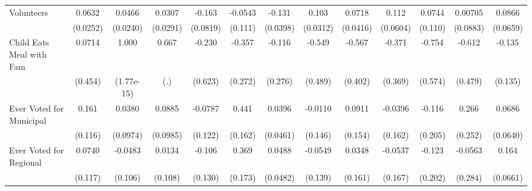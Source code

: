 {\begin{tabular}{l*{12}{c}}
\addlinespace
Volunteers  &      0.0632\sym{*}  &      0.0466         &      0.0307         &      -0.163\sym{*}  &     -0.0543         &      -0.131\sym{**} &       0.103\sym{***}&      0.0718         &       0.112         &      0.0744         &     0.00705         &      0.0866         \\
            &    (0.0252)         &    (0.0240)         &    (0.0291)         &    (0.0819)         &     (0.111)         &    (0.0398)         &    (0.0312)         &    (0.0416)         &    (0.0604)         &     (0.110)         &    (0.0883)         &    (0.0659)         \\
\addlinespace
Child Eats Meal with Fam&      0.0714         &       1.000\sym{***}&       0.667         &      -0.230         &      -0.357         &      -0.116         &      -0.549         &      -0.567         &      -0.371         &      -0.754         &      -0.612         &      -0.135         \\
            &     (0.454)         &  (1.77e-15)         &         (.)         &     (0.623)         &     (0.272)         &     (0.276)         &     (0.489)         &     (0.402)         &     (0.369)         &     (0.574)         &     (0.479)         &     (0.135)         \\
\addlinespace
Ever Voted for Municipal&       0.161         &      0.0380         &      0.0885         &     -0.0787         &       0.441\sym{**} &      0.0396         &     -0.0110         &      0.0911         &     -0.0396         &      -0.116         &       0.266         &      0.0686         \\
            &     (0.116)         &    (0.0974)         &    (0.0985)         &     (0.122)         &     (0.162)         &    (0.0461)         &     (0.146)         &     (0.154)         &     (0.162)         &     (0.205)         &     (0.252)         &    (0.0640)         \\
\addlinespace
Ever Voted for Regional&      0.0740         &     -0.0483         &      0.0134         &      -0.106         &       0.369\sym{*}  &      0.0488         &     -0.0549         &      0.0348         &     -0.0537         &      -0.123         &     -0.0563         &       0.164\sym{*}  \\
            &     (0.117)         &     (0.106)         &     (0.108)         &     (0.130)         &     (0.173)         &    (0.0482)         &     (0.139)         &     (0.161)         &     (0.167)         &     (0.202)         &     (0.284)         &    (0.0661)         \\

\end{tabular}}
